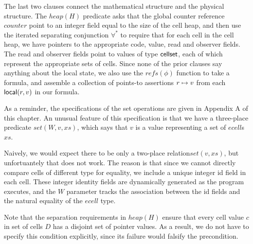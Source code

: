 The last two clauses connect the mathematical structure and the
physical structure. The $heap(H)$ predicate asks that the global
counter reference $counter$ point to an integer field equal to the
size of the cell heap, and then use the iterated separating
conjunction $\forall^*$ to require that for each cell in the cell
heap, we have pointers to the appropriate code, value, read and
observer fields. The read and observer fields point to values of type
$\mathsf{cellset}$, each of which represent the appropriate sets of cells.
Since none of the prior clauses say anything about the local state, we
also use the $\mathit{refs}(\phi)$ function to take a formula, and
assemble a collection of points-to assertions $r \mapsto v$ from
each $\mathsf{local}({r}, {v})$ in our formula.

As a reminder, the specifications of the set operations are given in
Appendix A of this chapter. An unusual feature of this specification
is that we have a three-place predicate $\mathit{set}(W, v, xs)$,
which says that $v$ is a value representing a set of $\mathit{ecell}$s
$xs$.

Naively, we would expect there to be only a two-place
relation$\mathit{set}(v, xs)$, but unfortuantely that does not work.
The reason is that since we cannot directly compare cells of different
type for equality, we include a unique integer id field in each
cell. These integer identity fields are dynamically generated as the
program executes, and the $W$ parameter tracks the association between
the id fields and the natural equality of the $\mathit{ecell}$ type.

Note that the separation requirements in $\mathit{heap}(H)$ ensure
that every cell value $c$ in set of cells $D$ has a disjoint set of
pointer values. As a result, we do not have to specify this condition
explicitly, since its failure would falsify the precondition.


